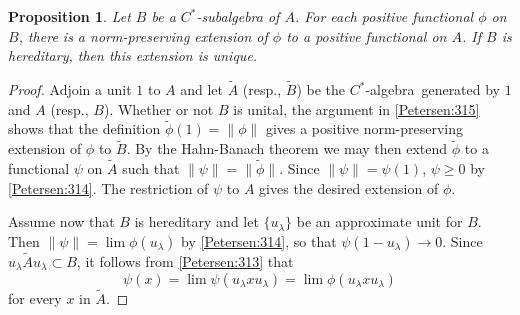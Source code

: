 \documentclass{book}
\newtheorem{proposition}[definition]{Proposition}
\def\cstar{\(C^*\)-algebra}
\begin{document}
\begin{proposition}\label{Petersen:316}
  Let \(B\) be a \(C^*\)-subalgebra of \(A\). For each positive functional \(\phi\) on \(B\),
  there is a norm-preserving extension of \(\phi\) to a positive functional on \(A\). If \(B\) is 
  hereditary, then this extension is unique.
\end{proposition}
\begin{proof}
  Adjoin a unit \(1\) to \(A\) and let \(\tilde{A}\) (resp., \(\tilde{B}\)) be the \cstar\ generated by \(1\) and \(A\)
  (resp., \(B\)). Whether or not \(B\) is unital, the argument in \ref{Petersen:315} shows that the definition \(\tilde{\phi}(1)=\|\phi\|\)
  gives a positive norm-preserving extension of \(\phi\) to \(\tilde{B}\).
  By the Hahn-Banach theorem we may then extend \(\tilde{\phi}\) to a functional \(\psi\) on \(\tilde{A}\)
  such that \(\|\psi\|=\|\tilde{\phi}\|\). Since \(\|\psi\|=\psi(1)\), \(\psi\geq0\) by \ref{Petersen:314}. The restriction of \(\psi\) to
  \(A\) gives the desired extension of \(\phi\).\par
  Assume now that \(B\) is hereditary and let \(\{u_\lambda\}\) be an approximate unit for \(B\).
  Then \(\|\psi\|=\lim\phi(u_\lambda)\) by \ref{Petersen:314}, so that \(\psi(1-u_\lambda)\rightarrow0\).
  Since \(u_\lambda\tilde{A}u_\lambda\subset B\), it follows from \ref{Petersen:313} that
  \[
    \psi(x)=\lim\psi(u_\lambda x u_\lambda)=\lim\phi(u_\lambda x u_\lambda)
  \]
  for every \(x\) in \(\tilde{A}\).
\end{proof}
\end{document}
